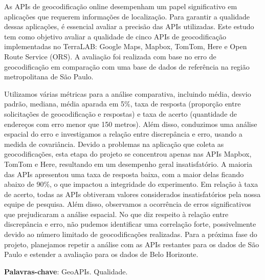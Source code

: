 
\setlength{\absparsep}{18pt} %
\begin{resumo}

  As APIs de geocodificação online desempenham um papel significativo em aplicações que requerem informações de localização. Para garantir a qualidade dessas aplicações, é essencial avaliar a precisão das APIs utilizadas. Este estudo tem como objetivo avaliar a qualidade de cinco APIs de geocodificação implementadas no TerraLAB: Google Maps, Mapbox, TomTom, Here e Open Route Service (ORS). A avaliação foi realizada com base no erro de geocodificação em comparação com uma base de dados de referência na região metropolitana de São Paulo.
  
  Utilizamos várias métricas para a análise comparativa, incluindo média, desvio padrão, mediana, média aparada em 5\%, taxa de resposta (proporção entre solicitações de geocodificação e respostas) e taxa de acerto (quantidade de endereços com erro menor que 150 metros). Além disso, conduzimos uma análise espacial do erro e investigamos a relação entre discrepância e erro, usando a medida de covariância. Devido a problemas na aplicação que coleta as geocodificações, esta etapa do projeto se concentrou apenas nas APIs Mapbox, TomTom e Here, resultando em um desempenho geral insatisfatório.
  A maioria das APIs apresentou uma taxa de resposta baixa, com a maior delas ficando abaixo de 90\%, o que impactou a integridade do experimento. Em relação à taxa de acerto, todas as APIs obtiveram valores considerados insatisfatórios pela nossa equipe de pesquisa. Além disso, observamos a ocorrência de erros significativos que prejudicaram a análise espacial. No que diz respeito à relação entre discrepância e erro, não pudemos identificar uma correlação forte, possivelmente devido ao número limitado de geocodificações realizadas.
  Para a próxima fase do projeto, planejamos repetir a análise com as APIs restantes para os dados de São Paulo e estender a avaliação para os dados de Belo Horizonte.
  

 \vspace{\onelineskip}
 \noindent
 \textbf{Palavras-chave}: GeoAPIs. Qualidade. 

\end{resumo}

